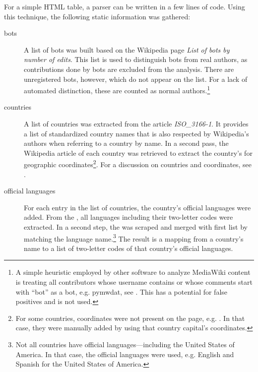 For a simple \ac{HTML} table, a parser can be written in a few lines of code.
Using this technique, the following static information was gathered:

\begin{description}
\item[bots] A list of bots was built based on the Wikipedia page \emph{List of bots by number of edits}. 
This list is used to distinguish bots from real authors, as contributions done by bots are excluded from the analysis.
There are unregistered bots, however, which do not appear on the list.
For a lack of automated distinction, these are counted as normal authors.\footnote{A simple heuristic employed by other software to analyze MediaWiki content is treating all contributors whose username contains or whose comments start with ``bot'' as a bot, e.g. pymwdat, see . This has a potential for false positives and is not used.}
\item[countries] A list of countries was extracted from the article \emph{ISO\_3166-1}. 
It provides a list of standardized country names that is also respected by Wikipedia's authors when referring to a country by name.
In a second pass, the Wikipedia article of each country was retrieved to extract the country's for geographic coordinates\footnote{For some countries, coordinates were not present on the page, e.g. . In that case, they were manually added by using that country capital's coordinates.}.
For a discussion on countries and coordinates, see .
\item[official languages] For each entry in the list of countries, the country's official languages were added.
From the , all languages including their two-letter codes were extracted.
In a second step, the  was scraped and merged with first list by matching the language name.\footnote{Not all countries have official languages---including the United States of America. In that case, the  official languages were used, e.g. English and Spanish for the United States of America.}
The result is a mapping from a country's name to a list of two-letter codes of that country's official languages.
\end{description}

